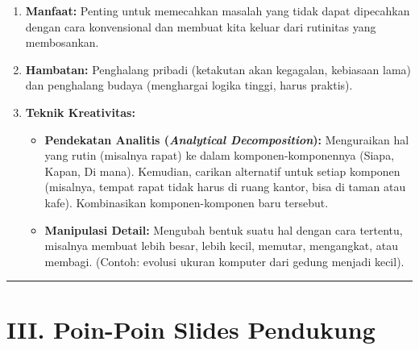 \documentclass[
  letterpaper,
  DIV=11,
  numbers=noendperiod]{scrreprt}
\providecommand{\tightlist}{%
  \setlength{\itemsep}{0pt}\setlength{\parskip}{0pt}}
\begin{document}
\begin{enumerate}
\def\labelenumi{\arabic{enumi}.}
\tightlist
\item
  \textbf{Manfaat:} Penting untuk memecahkan masalah yang tidak dapat
  dipecahkan dengan cara konvensional dan membuat kita keluar dari
  rutinitas yang membosankan.
\item
  \textbf{Hambatan:} Penghalang pribadi (ketakutan akan kegagalan,
  kebiasaan lama) dan penghalang budaya (menghargai logika tinggi, harus
  praktis).
\item
  \textbf{Teknik Kreativitas:}

  \begin{itemize}
  \tightlist
  \item
    \textbf{Pendekatan Analitis (\emph{Analytical Decomposition}):}
    Menguraikan hal yang rutin (misalnya rapat) ke dalam
    komponen-komponennya (Siapa, Kapan, Di mana). Kemudian, carikan
    alternatif untuk setiap komponen (misalnya, tempat rapat tidak harus
    di ruang kantor, bisa di taman atau kafe). Kombinasikan
    komponen-komponen baru tersebut.
  \item
    \textbf{Manipulasi Detail:} Mengubah bentuk suatu hal dengan cara
    tertentu, misalnya membuat lebih besar, lebih kecil, memutar,
    mengangkat, atau membagi. (Contoh: evolusi ukuran komputer dari
    gedung menjadi kecil).
  \end{itemize}
\end{enumerate}

\begin{center}\rule{0.5\linewidth}{0.5pt}\end{center}

\section{III. Poin-Poin Slides
Pendukung}\label{iii.-poin-poin-slides-pendukung}
\end{document}

